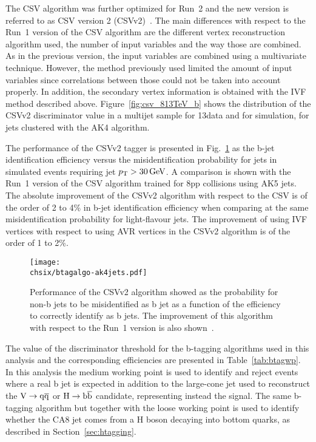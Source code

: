 The CSV algorithm was further optimized for Run~2 and the new version is referred to as CSV version 2 (CSVv2)~\cite{CMS-PAS-BTV-15-001}. The main differences with respect to the Run~1 version of the CSV algorithm are the different vertex reconstruction algorithm used, the number of input variables and the way those are combined. As in the previous version, the input variables are combined using a multivariate technique. However, the method previously used limited the amount of input variables since correlations between those could not be taken into account properly. In addition, the secondary vertex information is obtained with the IVF method described above. Figure~\ref{fig:csv_813TeV_b} shows the distribution of the CSVv2 discriminator value in a multijet sample for 13\TeV data and for simulation, for jets clustered with the AK4 algorithm.

The performance of the CSVv2 tagger is presented in Fig.~\ref{fig:btagalgo} as the b-jet identification efficiency versus the misidentification probability for jets in simulated \ttbar events requiring jet $p_{\mathrm{T}} > 30\,\text{Ge\hspace{-.08em}V}$. A comparison is shown with the Run~1 version of the CSV algorithm trained for 8\TeV pp collisions using AK5 jets. The absolute improvement of the CSVv2 algorithm with respect to the CSV is of the order of 2 to 4\% in b-jet identification efficiency when comparing at the same misidentification probability for light-flavour jets. The improvement of using IVF vertices with respect to using AVR vertices in the CSVv2 algorithm is of the order of 1 to 2\%.\\

\begin{figure}[!htb]
 \begin{center}
  \texttt{[image: \\chsix/btagalgo-ak4jets.pdf]}
 \end{center}
 \caption{Performance of the CSVv2 algorithm showed as the probability for non-b jets to be misidentified as b jet as a function of the efficiency to correctly identify as b jets. The improvement of this algorithm with respect to the Run~1 version is also shown~\cite{CMS-PAS-BTV-15-001}.}
 \label{fig:btagalgo}
\end{figure}

The value of the discriminator threshold for the b-tagging algorithms used in this analysis and the corresponding efficiencies are presented in Table~\ref{tab:btagwp}.
In this analysis the medium working point is used to identify and reject \ttbar events where a real b jet is expected in addition to the large-cone jet used to reconstruct the $\mathrm{V}\to\mathrm{q}\overline{\mathrm{q}}$ or $\mathrm{H}\to{\mathrm{b}\overline{\mathrm{b}}}$ candidate, representing instead the signal. The same b-tagging algorithm but together with the loose working point is used to identify whether the CA8 jet comes from a H boson decaying into bottom quarks, as described in Section~\ref{sec:htagging}.


